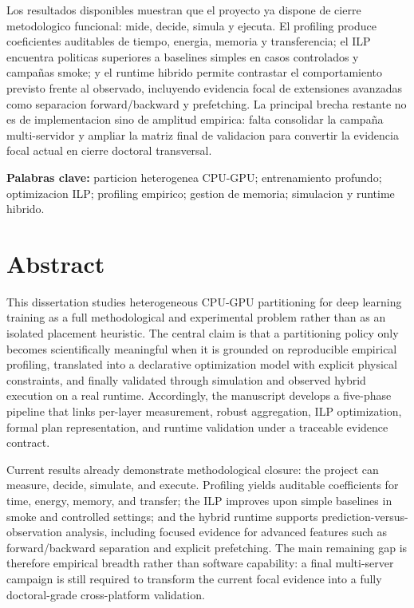 Los resultados disponibles muestran que el proyecto ya dispone de cierre metodologico funcional: mide, decide, simula y ejecuta. El profiling produce coeficientes auditables de tiempo, energia, memoria y transferencia; el ILP encuentra politicas superiores a baselines simples en casos controlados y campañas smoke; y el runtime hibrido permite contrastar el comportamiento previsto frente al observado, incluyendo evidencia focal de extensiones avanzadas como separacion forward/backward y prefetching. La principal brecha restante no es de implementacion sino de amplitud empirica: falta consolidar la campaña multi-servidor y ampliar la matriz final de validacion para convertir la evidencia focal actual en cierre doctoral transversal.

\vspace{0.6cm}
\noindent\textbf{Palabras clave:} particion heterogenea CPU-GPU; entrenamiento profundo; optimizacion ILP; profiling empirico; gestion de memoria; simulacion y runtime hibrido.

\chapter*{Abstract}
This dissertation studies heterogeneous CPU-GPU partitioning for deep learning training as a full methodological and experimental problem rather than as an isolated placement heuristic. The central claim is that a partitioning policy only becomes scientifically meaningful when it is grounded on reproducible empirical profiling, translated into a declarative optimization model with explicit physical constraints, and finally validated through simulation and observed hybrid execution on a real runtime. Accordingly, the manuscript develops a five-phase pipeline that links per-layer measurement, robust aggregation, ILP optimization, formal plan representation, and runtime validation under a traceable evidence contract.

Current results already demonstrate methodological closure: the project can measure, decide, simulate, and execute. Profiling yields auditable coefficients for time, energy, memory, and transfer; the ILP improves upon simple baselines in smoke and controlled settings; and the hybrid runtime supports prediction-versus-observation analysis, including focused evidence for advanced features such as forward/backward separation and explicit prefetching. The main remaining gap is therefore empirical breadth rather than software capability: a final multi-server campaign is still required to transform the current focal evidence into a fully doctoral-grade cross-platform validation.


